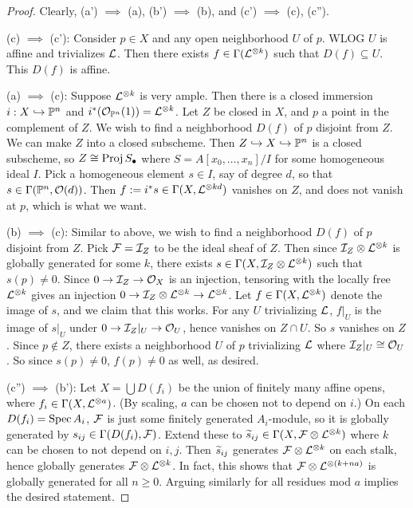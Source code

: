 \documentclass[11pt]{amsart}
\begin{document}
\begin{proof}
    Clearly, (a') $\implies$ (a), (b') $\implies$ (b), and (c') $\implies$ (c), (c'').

    (c) $\implies$ (c'): Consider $p\in X$ and any open neighborhood $U$ of $p$. WLOG $U$ is affine and trivializes $\mathcal{L}$. Then there exists $f\in \Gamma(\mathcal{L}^{\otimes k})$ such that $D(f)\subseteq U$. This $D(f)$ is affine.

    (a) $\implies$ (c): Suppose $\mathcal{L}^{\otimes k}$ is very ample. Then there is a closed immersion $i:X\hookrightarrow \mathbb{P}^n$ and $i^\ast(\mathcal{O}_{\mathbb{P}^n}(1)) = \mathcal{L}^{\otimes k}$. Let $Z$ be closed in $X$, and $p$ a point in the complement of $Z$. We wish to find a neighborhood $D(f)$ of $p$ disjoint from $Z$. We can make $Z$ into a closed subscheme. Then $Z\hookrightarrow X\hookrightarrow \mathbb{P}^n$ is a closed subscheme, so $Z \cong \operatorname{Proj} S_\bullet$ where $S = A[x_0,\dots,x_n]/I$ for some homogeneous ideal $I$. Pick a homogeneous element $s\in I$, say of degree $d$, so that $s\in \Gamma(\mathbb{P}^n, \mathcal{O}(d))$. Then $f:= i^\ast s \in \Gamma(X, \mathcal{L}^{\otimes kd})$ vanishes on $Z$, and does not vanish at $p$, which is what we want.

    (b) $\implies$ (c): Similar to above, we wish to find a neighborhood $D(f)$ of $p$ disjoint from $Z$. Pick $\mathcal{F} = \mathcal{I}_Z$ to be the ideal sheaf of $Z$. Then since $\mathcal{I}_Z\otimes \mathcal{L}^{\otimes k}$ is globally generated for some $k$, there exists $s\in \Gamma(X, \mathcal{I}_Z\otimes \mathcal{L}^{\otimes k})$ such that $s(p)\neq 0$. Since $0\to \mathcal{I}_Z\to \mathcal{O}_X$ is an injection, tensoring with the locally free $\mathcal{L}^{\otimes k}$ gives an injection $0\to \mathcal{I}_Z\otimes\mathcal{L}^{\otimes k} \to \mathcal{L}^{\otimes k}$. Let $f\in \Gamma(X, \mathcal{L}^{\otimes k})$ denote the image of $s$, and we claim that this works. For any $U$ trivializing $\mathcal{L}$, $f|_U$ is the image of $s|_U$ under $0\to \mathcal{I}_Z|_U \to \mathcal{O}_U$, hence vanishes on $Z\cap U$. So $s$ vanishes on $Z$. Since $p\notin Z$, there exists a neighborhood $U$ of $p$ trivializing $\mathcal{L}$ where $\mathcal{I}_Z|_U\cong \mathcal{O}_U$. So since $s(p) \neq 0$, $f(p)\neq 0$ as well, as desired.

    (c'') $\implies$ (b'): Let $X = \bigcup D(f_i)$ be the union of finitely many affine opens, where $f_i\in \Gamma(X, \mathcal{L}^{\otimes a})$. (By scaling, $a$ can be chosen not to depend on $i$.) On each $D(f_i) = \operatorname{Spec} A_i$, $\mathcal{F}$ is just some finitely generated $A_i$-module, so it is globally generated by $s_{ij}\in \Gamma(D(f_i), \mathcal{F})$. Extend these to $\widetilde{s}_{ij} \in \Gamma(X, \mathcal{F}\otimes \mathcal{L}^{\otimes k})$ where $k$ can be chosen to not depend on $i,j$. Then $\widetilde{s}_{ij}$ generates $\mathcal{F}\otimes \mathcal{L}^{\otimes k}$ on each stalk, hence globally generates $\mathcal{F}\otimes \mathcal{L}^{\otimes k}$. In fact, this shows that $\mathcal{F}\otimes \mathcal{L}^{\otimes (k+na)}$ is globally generated for all $n\ge 0$. Arguing similarly for all residues mod $a$ implies the desired statement.


\end{proof}
\end{document}

